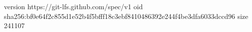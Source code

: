 version https://git-lfs.github.com/spec/v1
oid sha256:bf0e64f2c855d1e52b4f5bfff18c3ebf8410486392e244f4be3dfa6033dccd96
size 241107
